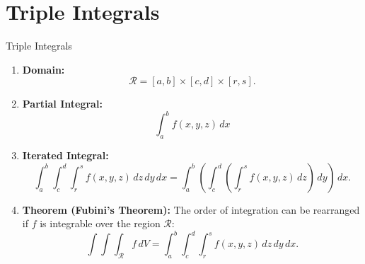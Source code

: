 \documentclass[aspectratio=169, UTF8]{beamer}
\begin{document}
\section{Triple Integrals}
\begin{frame}[label=2]{Triple Integrals}
    \begin{enumerate}
  \item \textbf{Domain:}
  $$\mathcal{R} = [a, b] \times [c, d] \times [r,s].$$

  \item \textbf{Partial Integral:}
  $$\int_a^b f(x, y, z) \, dx$$

  \item \textbf{Iterated Integral:}
  $$\int_a^b \int_c^d \int_r^s f(x, y, z) \, dz \, dy \, dx = \int_a^b \left(\int_c^d \left(\int_r^s f(x, y, z) \, dz\right) \, dy\right) \, dx.$$

  \item \textbf{Theorem (Fubini’s Theorem):} The order of integration can be rearranged if $f$ is integrable over the region $\mathcal{R}$:
  $$\int \int \int_{\mathcal{R}} f \, dV = \int_a^b \int_c^d \int_r^s f(x, y, z) \, dz \, dy \, dx.$$

\end{enumerate}

\end{frame}
\end{document}
